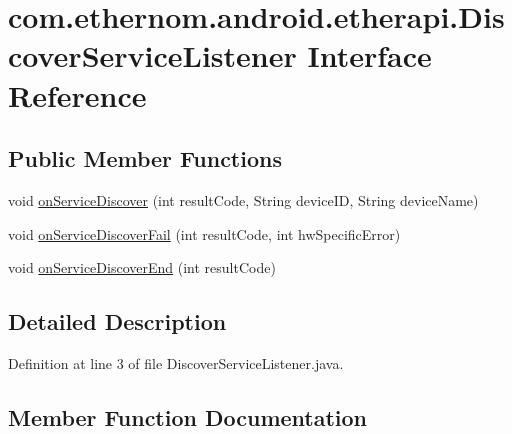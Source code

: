 \hypertarget{interfacecom_1_1ethernom_1_1android_1_1etherapi_1_1_discover_service_listener}{}\section{com.\+ethernom.\+android.\+etherapi.\+Discover\+Service\+Listener Interface Reference}
\label{interfacecom_1_1ethernom_1_1android_1_1etherapi_1_1_discover_service_listener}
\subsection*{Public Member Functions}
\begin{DoxyCompactItemize}
\item 
void \mbox{\hyperlink{interfacecom_1_1ethernom_1_1android_1_1etherapi_1_1_discover_service_listener_af4153d6e21ddccb41644a042c448e400}{on\+Service\+Discover}} (int result\+Code, String device\+ID, String device\+Name)
\item 
void \mbox{\hyperlink{interfacecom_1_1ethernom_1_1android_1_1etherapi_1_1_discover_service_listener_a0d7ab8a900298d299c863ce4b3527b8d}{on\+Service\+Discover\+Fail}} (int result\+Code, int hw\+Specific\+Error)
\item 
void \mbox{\hyperlink{interfacecom_1_1ethernom_1_1android_1_1etherapi_1_1_discover_service_listener_af4a5c1f5c82cde22d8ec1effe5a51ff9}{on\+Service\+Discover\+End}} (int result\+Code)
\end{DoxyCompactItemize}


\subsection{Detailed Description}


Definition at line 3 of file Discover\+Service\+Listener.\+java.



\subsection{Member Function Documentation}
\mbox{\label{interfacecom_1_1ethernom_1_1android_1_1etherapi_1_1_discover_service_listener_af4153d6e21ddccb41644a042c448e400}} 
